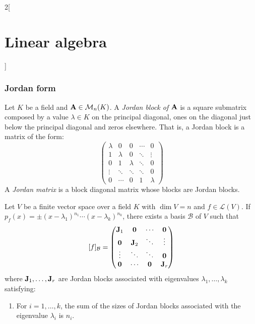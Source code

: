 \documentclass[../../../main.tex]{subfiles}
\begin{document}
\begin{multicols}{2}[\section{Linear algebra}]
  \subsubsection{Jordan form}
  \begin{definition}
    Let $K$ be a field and $\boldsymbol{\mathrm{A}}\in\mathcal{M}_n(K)$. A \textit{Jordan block of $\boldsymbol{\mathrm{A}}$} is a square submatrix composed by a value $\lambda\in K$ on the principal diagonal, ones on the diagonal just below the principal diagonal and zeros elsewhere. That is, a Jordan block is a matrix of the form:
    $$
      \begin{pmatrix}
        \lambda & 0       & 0       & \cdots & 0       \\
        1       & \lambda & 0       & \ddots & \vdots  \\
        0       & 1       & \lambda & \ddots & 0       \\
        \vdots  & \ddots  & \ddots  & \ddots & 0       \\
        0       & \cdots  & 0       & 1      & \lambda
      \end{pmatrix}
    $$
    A \textit{Jordan matrix} is a block diagonal matrix whose blocks are Jordan blocks.
  \end{definition}
  \begin{prop}
    Let $V$ be a finite vector space over a field $K$ with $\dim V=n$ and $f\in\mathcal{L}(V)$. If $p_f(x)=\pm(x-\lambda_1)^{n_1}\cdots(x-\lambda_k)^{n_k}$, there exists a basis $\mathcal{B}$ of $V$ such that
    $$[f]_{\mathcal{B}}=
      \begin{pmatrix}
        \boldsymbol{\mathrm{J}}_1 & \boldsymbol{\mathrm{0}}   & \cdots             & \boldsymbol{\mathrm{0}}   \\
        \boldsymbol{\mathrm{0}}   & \boldsymbol{\mathrm{J}}_2 & \ddots             & \vdots               \\
        \vdots               & \ddots               & \ddots             & \boldsymbol{\mathrm{0}}   \\
        \boldsymbol{\mathrm{0}}   & \cdots               & \boldsymbol{\mathrm{0}} & \boldsymbol{\mathrm{J}}_r \\
      \end{pmatrix}
    $$
    where $\boldsymbol{\mathrm{J}}_1,\ldots,\boldsymbol{\mathrm{J}}_r$ are Jordan blocks associated with eigenvalues $\lambda_1,\ldots,\lambda_k$ satisfying:
    \begin{enumerate}
      \item\label{LA_diag1} For $i=1,\ldots,k$, the sum of the sizes of Jordan blocks associated with the eigenvalue $\lambda_i$ is $n_i$.

\end{enumerate}
\end{prop}
\end{multicols}
\end{document}
